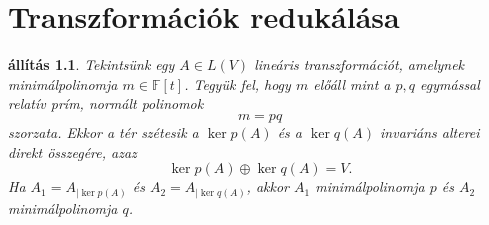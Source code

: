 \documentclass[a4paper, showtrims]{memoir}
\theoremstyle{plain}
\newtheorem{proposition}{állítás}[chapter]
\theoremstyle{remark}
\theoremstyle{definition}
\begin{document}
\chapter{Transzformációk redukálása}
\begin{proposition}
	Tekintsünk egy $A\in L\left( V \right)$ lineáris transzformációt,
	amelynek minimálpolinomja $m\in\mathbb{F}\left[ t \right]$.
	Tegyük fel, hogy $m$ előáll mint a $p,q$ egymással relatív prím, normált
	polinomok
	\[
		m=pq
	\]
	szorzata.
	Ekkor a tér szétesik a
	$\ker p\left( A \right)$ és a
	$\ker q\left( A \right)$ invariáns alterei direkt összegére, azaz
	\[
		\ker p\left( A \right)\oplus
		\ker q\left( A \right)=
		V.
	\]
	Ha $A_1=A_{|\ker p\left( A \right)}$ és
	$A_2=A_{|\ker q\left( A \right)}$, akkor $A_1$ minimálpolinomja $p$ és $A_2$ minimálpolinomja $q$.
\end{proposition}
\end{document}
